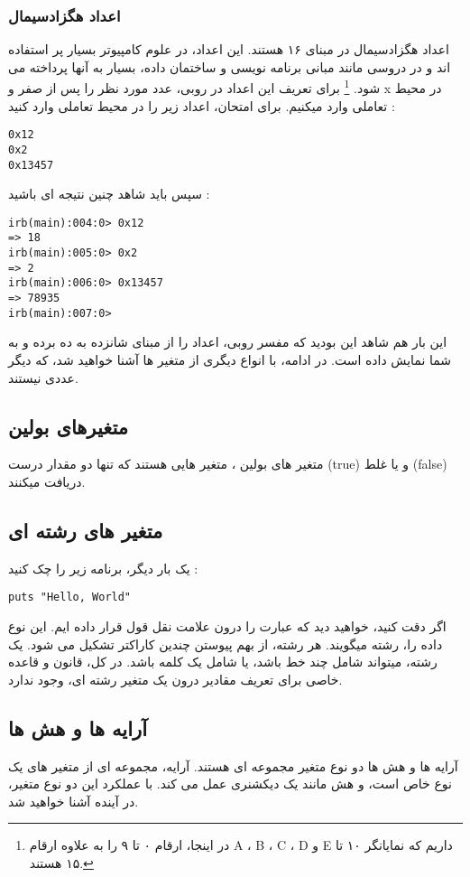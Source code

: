 \documentclass[11pt]{article}
\begin{document}
\subsubsection{اعداد هگزادسیمال}
اعداد هگزادسیمال
در مبنای ۱۶ هستند. این اعداد، در علوم کامپیوتر بسیار پر استفاده اند و در دروسی مانند مبانی برنامه نویسی و ساختمان داده، بسیار به آنها پرداخته می شود.
\footnote{
در اینجا، ارقام ۰ تا ۹ را به علاوه ارقام A ، B ، C ، D و E داریم که نمایانگر ۱۰ تا ۱۵ هستند.
}
برای تعریف این اعداد در روبی، عدد مورد نظر را پس از صفر و x در محیط تعاملی وارد میکنیم. برای امتحان، اعداد زیر را در محیط تعاملی وارد کنید :
\begin{latin}
\begin{verbatim}
0x12
0x2
0x13457
\end{verbatim}
\end{latin}
سپس باید شاهد چنین نتیجه ای باشید :
\begin{latin}
\begin{verbatim}
irb(main):004:0> 0x12
=> 18
irb(main):005:0> 0x2
=> 2
irb(main):006:0> 0x13457
=> 78935
irb(main):007:0> 
\end{verbatim}
\end{latin}
این بار هم شاهد این بودید که مفسر روبی، اعداد را از مبنای شانزده به ده برده و به شما نمایش داده است. در ادامه، با انواع دیگری از متغیر ها آشنا خواهید شد، که دیگر عددی نیستند.
\subsection{متغیرهای بولین}
متغیر های بولین
، متغیر هایی هستند که تنها دو مقدار درست (true) و یا غلط (false) دریافت میکنند. 
\subsection{متغیر های رشته ای}
یک بار دیگر، برنامه زیر را چک کنید :
\begin{latin}
\begin{verbatim}
puts "Hello, World"
\end{verbatim}
\end{latin}
اگر دقت کنید، خواهید دید که عبارت 
را درون علامت نقل قول قرار داده ایم. این نوع داده را، رشته
میگویند. هر رشته، از بهم پیوستن چندین کاراکتر 
تشکیل می شود. یک رشته، میتواند شامل چند خط باشد، یا شامل یک کلمه باشد. در کل، قانون و قاعده خاصی برای تعریف مقادیر درون یک متغیر رشته ای، وجود ندارد. 
\subsection{آرایه ها و هش ها}
آرایه ها
و هش ها
دو نوع متغیر مجموعه ای هستند. آرایه، مجموعه ای از متغیر های یک نوع خاص است، و هش مانند یک دیکشنری عمل می کند. با عملکرد این دو نوع متغیر، در آینده آشنا خواهید شد. 
\end{document}
